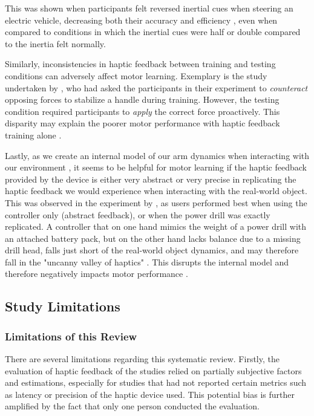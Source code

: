 This was shown when participants felt reversed inertial cues when steering an electric vehicle, decreasing both their accuracy and efficiency \cite{Macuga2019}, even when compared to conditions in which the inertial cues were half or double compared to the inertia felt normally.

Similarly, inconsistencies in haptic feedback between training and testing conditions can adversely affect motor learning. Exemplary is the study undertaken by \cite{Morris2007}, who had asked the participants in their experiment to \textit{counteract} opposing forces to stabilize a handle during training. However, the testing condition required participants to \textit{apply} the correct force proactively. This disparity may explain the poorer motor performance with haptic feedback training alone \cite{Morris2007}.

Lastly, as we create an internal model of our arm dynamics when interacting with our environment \cite{Pierella2019TheModels}, it seems to be helpful for motor learning if the haptic feedback provided by the device is either very abstract or very precise in replicating the haptic feedback we would experience when interacting with the real-world object. This was observed in the experiment by \cite{Yang2023}, as users performed best when using the controller only (abstract feedback), or when the power drill was exactly replicated. A controller that on one hand mimics the weight of a power drill with an attached battery pack, but on the other hand lacks balance due to a missing drill head, falls just short of the real-world object dynamics, and may therefore fall in the "uncanny valley of haptics" \cite{Berger2018TheHaptics}. This disrupts the internal model and therefore negatively impacts motor performance \cite{Yang2023}. 


\subsection{Study Limitations}

\subsubsection{Limitations of this Review}
There are several limitations regarding this systematic review.
Firstly, the evaluation of haptic feedback of the studies relied on partially subjective factors and estimations, especially for studies that had not reported certain metrics such as latency or precision of the haptic device used. This potential bias is further amplified by the fact that only one person conducted the evaluation.

